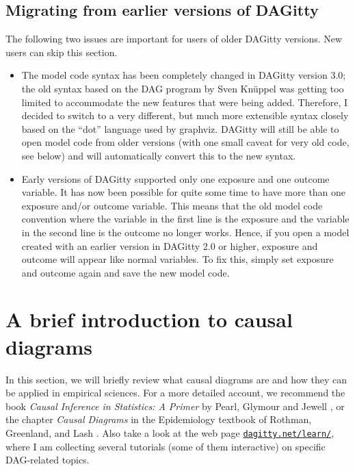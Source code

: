 \documentclass[a4paper]{article} %
\newcommand{\pp}{DAGitty\xspace}
\begin{document}
\subsection{Migrating from earlier versions of \pp}

The following two issues are important for users of older \pp versions. New users
can skip this section.

\begin{itemize}
\item The model code syntax has been completely changed in DAGitty version 3.0; the old syntax
	based on the DAG program by Sven Kn\"uppel \cite{KnueppelS2010} was getting too limited to accommodate the new features that were being added. Therefore, I decided to switch to a very different, but much more extensible syntax closely based on the ``dot'' language used by graphviz.
\pp will still be able to open model code from older versions (with one small caveat
for very old code, see below) and will automatically convert this to the new syntax.
\item Early versions of DAGitty supported only one exposure and one outcome variable. It has
now been possible for quite some time to have more than one exposure and/or outcome
variable. This means that the old model code convention where the variable in the first line
is the exposure and the variable in the second line is the outcome no longer works. Hence,
if you open a model created with an earlier version in DAGitty 2.0 or higher,
exposure and outcome will appear like normal variables. To fix this, simply set exposure and outcome again 
and save the new model code.
\end{itemize}

\section{A brief introduction to causal diagrams}

\label{sec:dagintro}

In this section, we will briefly review what causal diagrams are and how they can be 
applied in empirical sciences. For a more detailed account, we recommend 
the book \emph{Causal Inference in Statistics: A Primer} by Pearl, Glymour and Jewell \cite{Pearl2016}, or the chapter \emph{Causal Diagrams} in the Epidemiology 
textbook of Rothman, Greenland, and Lash \cite{RothmanGL2008}. 
Also take a look at the web page \href{https://dagitty.net/learn/}{\tt dagitty.net/learn/}, where I am collecting several tutorials (some of them interactive) on specific DAG-related  topics.
 
\end{document}
